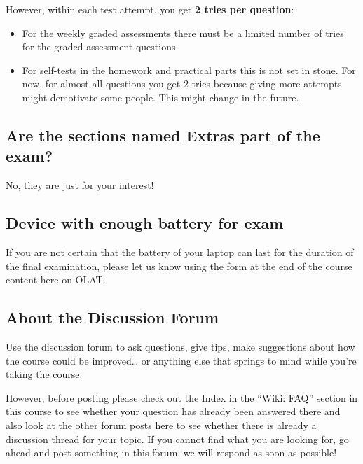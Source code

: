 \documentclass[
  letterpaper,
  8pt,
  a4paper]{book}
\providecommand{\tightlist}{%
  \setlength{\itemsep}{0pt}\setlength{\parskip}{0pt}}
\begin{document}
However, within each test attempt, you get \textbf{2 tries per
question}:

\begin{itemize}
\tightlist
\item
  For the weekly graded assessments there must be a limited number of
  tries for the graded assessment questions.
\item
  For self-tests in the homework and practical parts this is not set in
  stone. For now, for almost all questions you get 2 tries because
  giving more attempts might demotivate some people. This might change
  in the future.
\end{itemize}

\subsection*{Are the sections named Extras part of the
exam?}\label{are-the-sections-named-extras-part-of-the-exam}

No, they are just for your interest!

\subsection*{Device with enough battery for
exam}\label{device-with-enough-battery-for-exam}

If you are not certain that the battery of your laptop can last for the
duration of the final examination, please let us know using the form at
the end of the course content here on OLAT.

\subsection*{About the Discussion
Forum}\label{about-the-discussion-forum}

Use the discussion forum to ask questions, give tips, make suggestions
about how the course could be improved\ldots{} or anything else that
springs to mind while you're taking the course.

However, before posting please check out the Index in the ``Wiki: FAQ''
section in this course to see whether your question has already been
answered there and also look at the other forum posts here to see
whether there is already a discussion thread for your topic. If you
cannot find what you are looking for, go ahead and post something in
this forum, we will respond as soon as possible!
\end{document}
